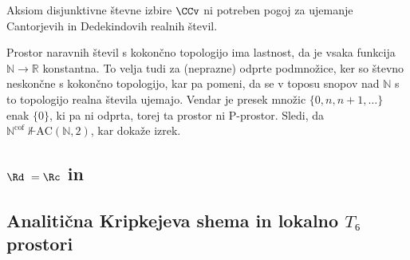 \begin{izrek}
  Aksiom disjunktivne števne izbire \(\CCv\) ni potreben pogoj za ujemanje
  Cantorjevih in Dedekindovih realnih števil.
\end{izrek}
\begin{dokaz}
  Prostor naravnih števil s kokončno topologijo ima lastnost, da je vsaka
  funkcija \(ℕ → ℝ\) konstantna. To velja tudi za (neprazne) odprte podmnožice,
  ker so števno neskončne s kokončno topologijo, kar pa pomeni, da se v toposu
  snopov nad \(ℕ\) s to topologijo realna števila ujemajo. Vendar je presek
  množic \(\{0, n, n+1, …\} \) enak \(\{0\}\), ki pa ni odprta, torej ta prostor
  ni P-prostor. Sledi, da \({ℕ^{\text{cof}}~\not⊩ \mathrm{AC}(ℕ, 2)}\), kar
  dokaže izrek.
\end{dokaz}


\subsection{\(\Rd\ = \Rc\) in \alpo*}
\subsection{Analitična Kripkejeva shema in lokalno \(T₆\) prostori}


